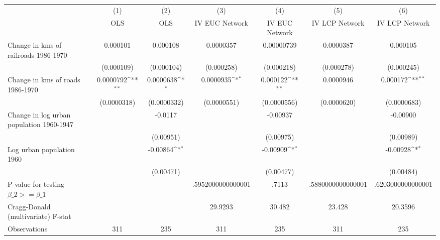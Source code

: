 {
\def\sym#1{\ifmmode^{#1}\else\(^{#1}\)\fi}
\begin{tabular}{l*{6}{c}}
\hline\hline
                &\multicolumn{1}{c}{(1)}&\multicolumn{1}{c}{(2)}&\multicolumn{1}{c}{(3)}&\multicolumn{1}{c}{(4)}&\multicolumn{1}{c}{(5)}&\multicolumn{1}{c}{(6)}\\
                &\multicolumn{1}{c}{OLS}&\multicolumn{1}{c}{OLS}&\multicolumn{1}{c}{IV EUC Network}&\multicolumn{1}{c}{IV EUC Network}&\multicolumn{1}{c}{IV LCP Network}&\multicolumn{1}{c}{IV LCP Network}\\
\hline
Change in kms of railroads 1986-1970& 0.000101         & 0.000108         &0.0000357         &0.00000739         &0.0000387         & 0.000105         \\
                &(0.000109)         &(0.000104)         &(0.000258)         &(0.000218)         &(0.000278)         &(0.000245)         \\
[1em]
Change in kms of roads 1986-1970&0.0000792\sym{**} &0.0000638\sym{*}  &0.0000935\sym{*}  & 0.000122\sym{**} &0.0000946         & 0.000172\sym{**} \\
                &(0.0000318)         &(0.0000332)         &(0.0000551)         &(0.0000556)         &(0.0000620)         &(0.0000683)         \\
[1em]
Change in log urban population 1960-1947&                  &  -0.0117         &                  & -0.00937         &                  & -0.00900         \\
                &                  &(0.00951)         &                  &(0.00975)         &                  &(0.00989)         \\
[1em]
Log urban population 1960&                  & -0.00864\sym{*}  &                  & -0.00909\sym{*}  &                  & -0.00928\sym{*}  \\
                &                  &(0.00471)         &                  &(0.00477)         &                  &(0.00484)         \\
\hline
P-value for testing $\beta\_{2} >= \beta\_{1}$&                  &                  &.5952000000000001         &    .7113         &.5880000000000001         &.6203000000000001         \\
Cragg-Donald (multivariate) F-stat&                  &                  &  29.9293         &   30.482         &   23.428         &  20.3596         \\
Observations    &      311         &      235         &      311         &      235         &      311         &      235         \\
\hline\hline
\end{tabular}
}
